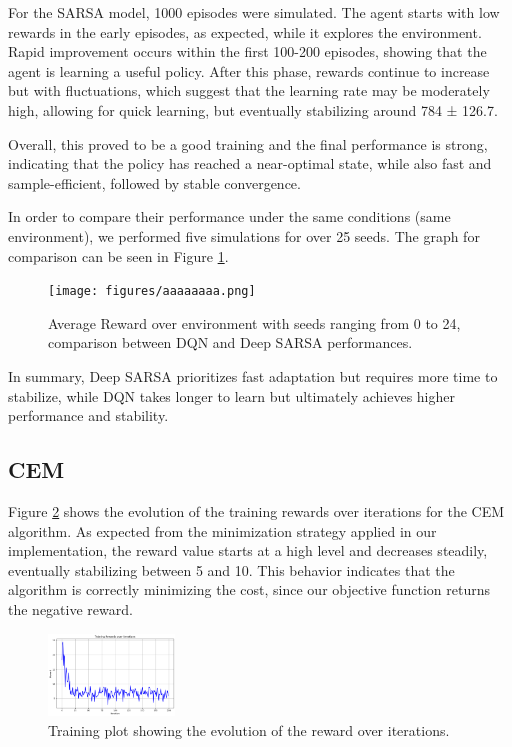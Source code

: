 \documentclass[../CSC_52081_EP.tex]{subfiles}
\begin{document}
For the SARSA model, 1000 episodes were simulated. The agent starts with low rewards in the early episodes, as expected, while it explores the environment. Rapid improvement occurs within the first 100-200 episodes, showing that the agent is learning a useful policy. After this phase, rewards continue to increase but with fluctuations, which suggest that the learning rate may be moderately high, allowing for quick learning, but eventually stabilizing around 784 ± 126.7.

Overall, this proved to be a good training and the final performance is strong, indicating that the policy has reached a near-optimal state, while also fast and sample-efficient, followed by stable convergence.

In order to compare their performance under the same conditions (same environment), we performed five simulations for over 25 seeds. The graph for comparison can be seen in Figure \ref{fig:SARSA_DQN_comparison}.

\begin{figure}[H]
    \centering
    \texttt{[image: figures/aaaaaaaa.png]}
    \caption{Average Reward over environment with seeds ranging from 0 to 24, comparison between DQN and Deep SARSA performances.}
    \label{fig:SARSA_DQN_comparison}
\end{figure}

In summary, Deep SARSA prioritizes fast adaptation but requires more time to stabilize, while DQN takes longer to learn but ultimately achieves higher performance and stability.

\subsection{CEM}

Figure \ref{fig:train_plot} shows the evolution of the training rewards over iterations for the CEM algorithm. As expected from the minimization strategy applied in our implementation, the reward value starts at a high level and decreases steadily, eventually stabilizing between 5 and 10. This behavior indicates that the algorithm is correctly minimizing the cost, since our objective function returns the negative reward.

\begin{figure}[H]
    \centering
    \includegraphics[width=0.3\textwidth]{figures/CEM_train.png}
    \caption{Training plot showing the evolution of the reward over iterations.}
    \label{fig:train_plot}
\end{figure}
\end{document}
